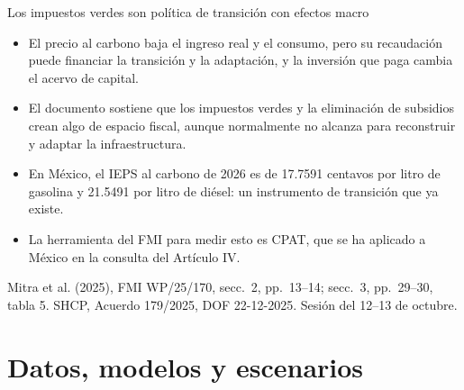 \documentclass[aspectratio=169,11pt]{beamer}
\newcommand{\fuente}[1]{\par\vfill{\small\color{cGris}#1\par}}
\newcommand{\FMI}{Mitra et al. (2025), FMI WP/25/170}
\begin{document}
\begin{frame}{Los impuestos verdes son política de transición con efectos macro}
  \begin{itemize}
    \item<1-> El precio al carbono baja el ingreso real y el consumo, pero su recaudación puede financiar la transición y la adaptación, y la inversión que paga cambia el acervo de capital.
    \item<2-> El documento sostiene que los impuestos verdes y la eliminación de subsidios crean algo de espacio fiscal, aunque normalmente no alcanza para reconstruir y adaptar la infraestructura.
    \item<3-> En México, el IEPS al carbono de 2026 es de 17.7591 centavos por litro de gasolina y 21.5491 por litro de diésel: un instrumento de transición que ya existe.
    \item<4-> La herramienta del FMI para medir esto es CPAT, que se ha aplicado a México en la consulta del Artículo IV.
  \end{itemize}
  \fuente{\FMI, secc.~2, pp.~13--14; secc.~3, pp.~29--30, tabla 5. SHCP, Acuerdo 179/2025, DOF 22-12-2025. Sesión del 12--13 de octubre.}
\end{frame}

\section{Datos, modelos y escenarios}
\end{document}
